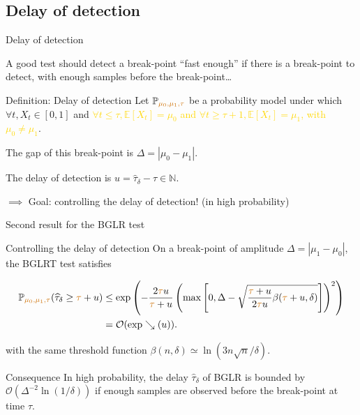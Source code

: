 \documentclass[11pt,english,ignorenonframetext,]{beamer}
\begin{document}
\subsection{\hfill{}Delay of detection\hfill{}}

\begin{frame}{Delay of detection}

  A good test should detect a break-point ``fast enough'' if there is a break-point to detect, with enough samples before the break-point\ldots

  \pause
  \begin{block}{Definition: Delay of detection}
    Let $\mathbb{P}_{\textcolor{gold}{\mu_0,\mu_1,\tau}}$ be a probability model under which $\forall t, X_t \in[0,1]$ and \textcolor{gold}{$\forall t \leq \tau, \mathbb{E}[X_t] = \mu_0$ and $\forall t \geq \tau + 1, \mathbb{E}[X_t] = \mu_1$,
    with $\mu_0 \neq \mu_1$}.

    The \alert{gap} of this break-point is $\Delta = |\mu_0 - \mu_1|$.

    The \alert{delay of detection} is $u = \widehat{\tau}_{\delta} - \tau \in\mathbb{N}$.
  \end{block}

  \alert{$\implies$ Goal: controlling the delay of detection!} (in high probability)

\end{frame}

\begin{frame}{Second result for the BGLR test \dSmiley{}}

  \begin{block}{Controlling the delay of detection}
      On a break-point of amplitude $\Delta = |\mu_1 - \mu_0|$,
      the BGLRT test satisfies
      \begin{small}
        \begin{align*}
            \mathbb{P}_{\textcolor{gold}{\mu_0,\mu_1,\tau}} (\widehat{\tau}_{\delta} \geq \textcolor{gold}{\tau} + u) &\leq \exp\left( -\frac{2\textcolor{gold}{\tau} u}{\textcolor{gold}{\tau} + u}\left(\max\left[ 0, \Delta - \sqrt{\frac{\textcolor{gold}{\tau} + u}{2\textcolor{gold}{\tau} u} \beta(\textcolor{gold}{\tau} + u,\delta)} \right]\right)^2 \right) \\
            &= \mathcal{O}(\exp\searrow(u)).
        \end{align*}
      \end{small}
      with the same threshold function
      $\beta(n,\delta) \simeq \ln(3n \sqrt{n}/\delta)$.
  \end{block}

  \begin{exampleblock}{Consequence}
    In high probability, \alert{the delay $\widehat{\tau}_\delta$ of BGLR is bounded} by $\mathcal{O}(\Delta^{-2} \ln(1/\delta))$ \alert{if enough samples are observed before the break-point} at time $\tau$.
  \end{exampleblock}

\end{frame}
\end{document}
